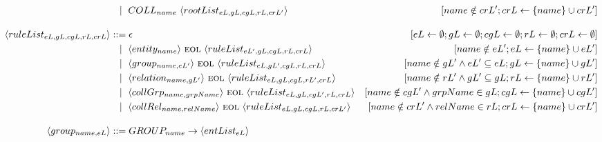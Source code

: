 \begin{landscape}
\begin{adjustbox}{max width=\linewidth,max height=.95\textheight,valign=c}
{\begin{align}
                                                            & ~~ \mid ~ COLL_{name} ~ \langle rootList_{eL,gL,cgL,rL,crL'} \rangle                                         & [name \notin crL'; crL \gets \{name\} \cup crL']                                                                        \\[1em]
                \langle ruleList_{eL,gL,cgL,rL,crL} \rangle & ::= \epsilon                                                                                                 & [eL \gets \emptyset; gL \gets \emptyset; cgL \gets \emptyset; rL \gets \emptyset; crL \gets \emptyset]                  \\
                                                            & ~~ \mid ~ \langle entity_{name}     \rangle ~\textsc{eol}~ \langle ruleList_{eL',gL,cgL,rL,crL} \rangle      & [name \notin eL'; eL \gets \{name\} \cup eL']                                                                           \\
                                                            & ~~ \mid ~ \langle group_{name, eL'}   \rangle ~\textsc{eol}~ \langle ruleList_{eL,gL',cgL,rL,crL} \rangle    & [name \notin gL' \land eL' \subseteq eL; gL \gets \{name\} \cup gL']                                                    \\
                                                            & ~~ \mid ~ \langle relation_{name, gL'}  \rangle ~\textsc{eol}~ \langle ruleList_{eL,gL,cgL,rL',crL} \rangle  & [name \notin rL' \land gL' \subseteq gL; rL \gets \{name\} \cup rL']                                                    \\
                                                            & ~~ \mid ~ \langle collGrp_{name,grpName} \rangle ~\textsc{eol}~ \langle ruleList_{eL,gL,cgL',rL,crL} \rangle & [name \notin cgL' \land grpName \in gL; cgL \gets \{name\} \cup cgL']                                                   \\
                                                            & ~~ \mid ~ \langle collRel_{name,relName} \rangle ~\textsc{eol}~ \langle ruleList_{eL,gL,cgL,rL,crL'} \rangle & [name \notin crL' \land relName \in rL; crL \gets \{name\} \cup crL']                                                   \\[1em]
                \langle group_{name, eL} \rangle            & ::= GROUP_{name} \to \langle entList_{eL} \rangle                                                                                                                                                                                      \\

\end{align}}
\end{adjustbox}
\end{landscape}
